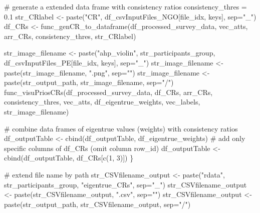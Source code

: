 \documentclass[
]{article}
\newenvironment{Shaded}{\begin{snugshade}}{\end{snugshade}}
\newcommand{\AttributeTok}[1]{\textcolor[rgb]{0.00,0.34,0.68}{#1}}
\newcommand{\CommentTok}[1]{\textcolor[rgb]{0.54,0.53,0.53}{#1}}
\newcommand{\DecValTok}[1]{\textcolor[rgb]{0.69,0.50,0.00}{#1}}
\newcommand{\FloatTok}[1]{\textcolor[rgb]{0.69,0.50,0.00}{#1}}
\newcommand{\FunctionTok}[1]{\textcolor[rgb]{0.39,0.29,0.61}{#1}}
\newcommand{\NormalTok}[1]{\textcolor[rgb]{0.12,0.11,0.11}{#1}}
\newcommand{\OtherTok}[1]{\textcolor[rgb]{0.00,0.43,0.16}{#1}}
\newcommand{\StringTok}[1]{\textcolor[rgb]{0.75,0.01,0.01}{#1}}
\begin{document}
\begin{Shaded}
\begin{Highlighting}[]
  \CommentTok{\# generate a extended data frame with consistency ratios}
\NormalTok{  consistency\_thres }\OtherTok{=} \FloatTok{0.1}
\NormalTok{  str\_CRlabel }\OtherTok{\textless{}{-}} \FunctionTok{paste}\NormalTok{(}\StringTok{"CR"}\NormalTok{, df\_csvInputFiles\_NGO[file\_idx, keys], }\AttributeTok{sep=}\StringTok{"\_"}\NormalTok{)}
\NormalTok{  df\_CRs }\OtherTok{\textless{}{-}} \FunctionTok{func\_genCR\_to\_dataframe}\NormalTok{(df\_processed\_survey\_data, vec\_atts, arr\_CRs, consistency\_thres, str\_CRlabel)}
  
\NormalTok{  str\_image\_filename }\OtherTok{\textless{}{-}} \FunctionTok{paste}\NormalTok{(}\StringTok{"ahp\_violin"}\NormalTok{, str\_participants\_group, df\_csvInputFiles\_PE[file\_idx, keys], }\AttributeTok{sep=}\StringTok{"\_"}\NormalTok{)}
\NormalTok{  str\_image\_filename }\OtherTok{\textless{}{-}} \FunctionTok{paste}\NormalTok{(str\_image\_filename, }\StringTok{".png"}\NormalTok{, }\AttributeTok{sep=}\StringTok{""}\NormalTok{)}
\NormalTok{  str\_image\_filename }\OtherTok{\textless{}{-}} \FunctionTok{paste}\NormalTok{(str\_output\_path, str\_image\_filename, }\AttributeTok{sep=}\StringTok{"/"}\NormalTok{)}
  \FunctionTok{func\_visuPriosCRs}\NormalTok{(df\_processed\_survey\_data, df\_CRs, arr\_CRs, consistency\_thres, vec\_atts, df\_eigentrue\_weights, vec\_labels, str\_image\_filename)}
  
  \CommentTok{\# combine data frames of eigentrue values (weights) with consistency ratios}
\NormalTok{  df\_outputTable }\OtherTok{\textless{}{-}} \FunctionTok{cbind}\NormalTok{(df\_outputTable, df\_eigentrue\_weights)}
  \CommentTok{\# add only specific columns of \textquotesingle{}df\_CRs\textquotesingle{} (omit column \textquotesingle{}row\_id\textquotesingle{})}
\NormalTok{  df\_outputTable }\OtherTok{\textless{}{-}} \FunctionTok{cbind}\NormalTok{(df\_outputTable, df\_CRs[}\FunctionTok{c}\NormalTok{(}\DecValTok{1}\NormalTok{, }\DecValTok{3}\NormalTok{)])}
\NormalTok{\}}

\CommentTok{\# extend file name by path}
\NormalTok{str\_CSVfilename\_output }\OtherTok{\textless{}{-}} \FunctionTok{paste}\NormalTok{(}\StringTok{"rdata"}\NormalTok{, str\_participants\_group, }\StringTok{"eigentrue\_CRs"}\NormalTok{, }\AttributeTok{sep=}\StringTok{"\_"}\NormalTok{)}
\NormalTok{str\_CSVfilename\_output }\OtherTok{\textless{}{-}} \FunctionTok{paste}\NormalTok{(str\_CSVfilename\_output, }\StringTok{".csv"}\NormalTok{, }\AttributeTok{sep=}\StringTok{""}\NormalTok{)}
\NormalTok{str\_CSVfilename\_output }\OtherTok{\textless{}{-}} \FunctionTok{paste}\NormalTok{(str\_output\_path, str\_CSVfilename\_output, }\AttributeTok{sep=}\StringTok{"/"}\NormalTok{)}


\end{Highlighting}
\end{Shaded}
\end{document}

